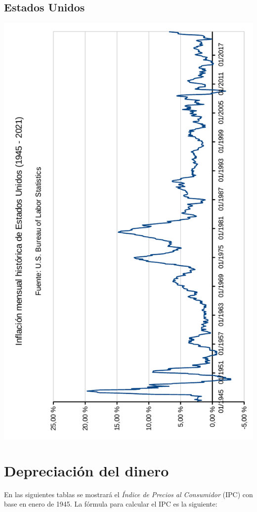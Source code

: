 \documentclass[12pt,a4paper,twoside]{book}
\begin{document}

\newpage

\subsection{Estados Unidos}


\newpage

\begin{center}
\includegraphics[scale=0.975,angle=180]{img/infl-usa.pdf}
\end{center}
\newpage

\section{Depreciación del dinero}
En las siguientes tablas se mostrará el \textit{Índice de Precios al Consumidor} (IPC) con base en enero de 1945. La fórmula para calcular el IPC es la siguiente:
\end{document}
